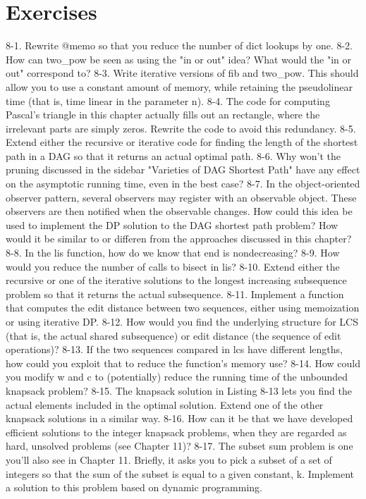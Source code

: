 \section{Exercises}
8-1. Rewrite @memo so that you reduce the number of dict lookups by one.
8-2. How can two\_pow be seen as using the "in or out" idea? What would the "in or out" correspond to?
8-3. Write iterative versions of fib and two\_pow. This should allow you to use a constant amount of memory, while retaining the pseudolinear time (that is, time linear in the parameter n).
8-4. The code for computing Pascal's triangle in this chapter actually fills out an rectangle, where the irrelevant parts are simply zeros. Rewrite the code to avoid this redundancy.
8-5. Extend either the recursive or iterative code for finding the length of the shortest path in a DAG so that it returns an actual optimal path.
8-6. Why won't the pruning discussed in the sidebar "Varieties of DAG Shortest Path" have any effect on the asymptotic running time, even in the best case?
8-7. In the object-oriented observer pattern, several observers may register with an observable object. These observers are then notified when the observable changes. How could this idea be used to implement the DP solution to the DAG shortest path problem? How would it be similar to or differen from the approaches discussed in this chapter?
8-8. In the lis function, how do we know that end is nondecreasing?
8-9. How would you reduce the number of calls to bisect in lis?
8-10. Extend either the recursive or one of the iterative solutions to the longest increasing subsequence problem so that it returns the actual subsequence.
8-11. Implement a function that computes the edit distance between two sequences, either using
memoization or using iterative DP.
8-12. How would you find the underlying structure for LCS (that is, the actual shared subsequence) or edit distance (the sequence of edit operations)?
8-13. If the two sequences compared in lcs have different lengths, how could you exploit that to reduce the function's memory use?
8-14. How could you modify w and c to (potentially) reduce the running time of the unbounded
knapsack problem?
8-15. The knapsack solution in Listing 8-13 lets you find the actual elements included in the optimal solution. Extend one of the other knapsack solutions in a similar way.
8-16. How can it be that we have developed efficient solutions to the integer knapsack problems, when they are regarded as hard, unsolved problems (see Chapter 11)?
8-17. The subset sum problem is one you'll also see in Chapter 11. Briefly, it asks you to pick a subset of a set of integers so that the sum of the subset is equal to a given constant, k. Implement a solution to this problem based on dynamic programming.
